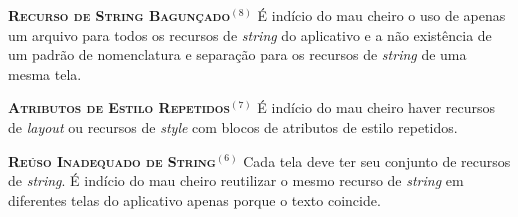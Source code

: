   \noindent
  \textbf{\textsc{{\small Recurso de String Bagunçado}}}$^{(8)}$
      É indício do mau cheiro o uso de apenas um arquivo para todos os recursos de \textit{string} do aplicativo e a não existência de um padrão de nomenclatura e separação para os recursos de \textit{string} de uma mesma tela. 


  \noindent
  \textbf{\textsc{{\small Atributos de Estilo Repetidos}}}$^{(7)}$
      É indício do mau cheiro haver recursos de \textit{layout} ou recursos de \textit{style} com blocos de atributos de estilo repetidos. 


  \noindent
  \textbf{\textsc{{\small Reúso Inadequado de String}}}$^{(6)}$
      Cada tela deve ter seu conjunto de recursos de \textit{string}. É indício do mau cheiro reutilizar o mesmo recurso de \textit{string} em diferentes telas do aplicativo apenas porque o texto coincide.


